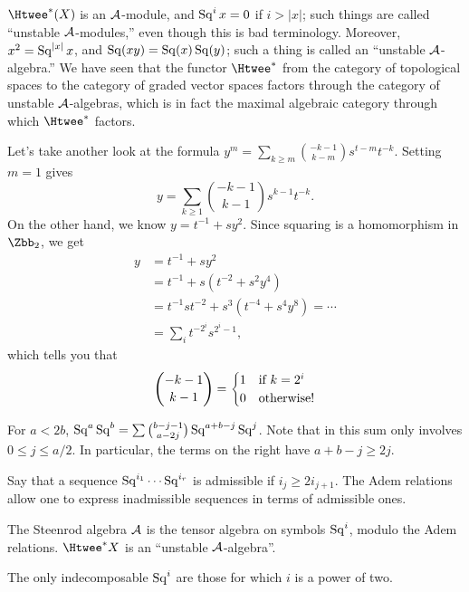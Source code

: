 $\Htwee^* (X)$ is an $\mathcal{A}$-module, and $\operatorname{Sq}^i x = 0$ if $i > |x|$; such things are called ``unstable $\mathcal{A}$-modules,'' even though this is bad terminology.  Moreover, $x^2 = \operatorname{Sq}^{|x|} x$, and $\operatorname{Sq}(xy) = \operatorname{Sq}(x) \operatorname{Sq}(y)$; such a thing is called an ``unstable $\mathcal{A}$-algebra.''  %
We have seen that the functor $\Htwee^*$ from the category of topological spaces to the category of graded vector spaces factors through the category of unstable $\mathcal{A}$-algebras, which is in fact
%
the maximal algebraic category through which $\Htwee^*$ factors. %

Let's take another look at the formula $y^m = \sum_{k \ge m} \binom{-k-1}{k-m} s^{t-m} t^{-k}$.  Setting $m=1$ gives \[y = \sum_{k \ge 1} \binom{-k-1}{k-1} s^{k-1} t^{-k}.\]  On the other hand, we know $y = t^{-1} + sy^2$.  Since squaring is a homomorphism in $\Zbb_2$, we get
\begin{align*}
y & = t^{-1} + sy^2 \\
& = t^{-1} + s(t^{-2} + s^2 y^4) \\
& = t^{-1} st^{-2} + s^3(t^{-4} + s^4y^8) = \cdots \\
& = \sum_i t^{-2^i} s^{2^i-1},
\end{align*}
which tells you that
\[
\binom{-k-1}{k-1} = \begin{cases} 1 & \hbox{if $k = 2^i$} \\ 0 & \hbox{otherwise!} \end{cases}
\]

\fi
\begin{SummaryNote}
\Bullet For $a<2b$, $\operatorname{Sq}^a\operatorname{Sq}^b=\sum\binom{b-j-1}{a-2j}\operatorname{Sq}^{a+b-j}\operatorname{Sq}^j$. Note that in this sum only involves $0\leq j\leq a/2$. In particular, the terms on the right have $a+b-j\geq 2j$.

\Bullet Say that a sequence $\operatorname{Sq}^{i_1}\cdots \operatorname{Sq}^{i_r}$ is admissible if $i_j\geq2i_{j+1}$. The Adem relations allow one to express inadmissible sequences in terms of admissible ones.

\Bullet The Steenrod algebra $\mathcal{A}$ is the tensor algebra on symbols $\operatorname{Sq}^i$, modulo the Adem relations. $\Htwee^*X$ is an ``unstable $\mathcal{A}$-algebra''.

\Bullet The only indecomposable $\operatorname{Sq}^i$ are those for which $i$ is a power of two.
\end{SummaryNote}

